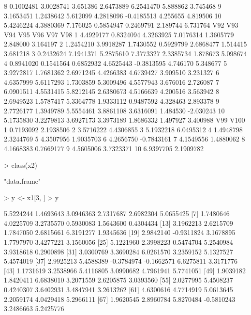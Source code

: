 \documentclass[12pt]{article}
\begin{document}
\begin{Schunk}
\begin{Soutput}
8   0.1002481 3.0028741 3.651386 2.6473889  6.2541470  5.888862 3.745468
9   3.1653451 1.2438642 5.612099 4.2818096 -0.4185513  4.255655 4.819506
10  5.4246224 4.3880369 7.176025 0.5854947  0.2469791  2.189744 6.731764
         V92       V93       V94       V95        V96      V97       V98
1  4.4929177 0.8324094 4.3263925 7.0176314  1.3605779 2.848000  3.164197
2  1.2454210 3.9918287 1.7430552 0.5929799  2.6868477 1.514415  3.681218
3  0.2432624 7.1941371 5.2875610 7.3773327  2.3385734 1.878673  5.098674
4  0.8941020 0.1541564 0.6852932 4.6525443 -0.3813595 4.746170  5.348677
5  3.9272817 1.7681362 2.6971245 4.4266383  4.6739427 3.909510  3.231327
6  4.6357999 5.6117293 1.7303859 5.3009496  4.5577943 3.676016  2.726087
7  6.0901511 4.5531415 5.8212145 2.6380673  4.5166639 4.200516  3.563942
8  2.6949523 1.5787417 5.3364778 1.9333112  0.9487592 4.328463  2.893378
9  2.7726177 1.3949789 5.5554461 3.8861108  3.6316091 1.484530 -2.030243
10 5.1735830 3.2279813 3.6927173 3.3973189  1.8686332 1.497927  3.400988
         V99       V100
1  0.7193092  2.1938506
2  3.5716222  4.4306855
3  5.1932218  6.0495312
4  1.4948798  2.3244769
5  4.3507956  1.9035703
6  4.2656750 -0.7843161
7  4.1549556  1.4880062
8  4.1668383  0.7669177
9  4.5605006  3.7323371
10 6.9397705  2.1909782
\end{Soutput}
\begin{Sinput}
> class(x2)
\end{Sinput}
\begin{Soutput}
[1] "data.frame"
\end{Soutput}
\begin{Sinput}
> y <- x1[3, ] 
> y
\end{Sinput}
\begin{Soutput}
  [1]  5.5224244  1.4693643  3.0946363  2.7317687  2.6982304  5.0655425
  [7]  1.7480646  4.0225709  3.2735570  0.5930083  1.5643600  0.4304434
 [13]  3.1962213  2.6215709  1.7847050  2.6815661  6.3191277  1.9345636
 [19]  2.9842140 -0.9311824  3.1678895  1.7797970  3.4277221  3.1560056
 [25]  5.1221960  2.3998223  0.5474704  5.2540984  3.9318618  0.2900898
 [31]  3.0300769  3.3690284  6.0261570  3.2359152  5.1327527  5.4574019
 [37]  2.9925213  5.4588389 -0.3784974 -0.1662571  6.6275811  3.3171776
 [43]  1.1731619  3.2538966  5.4116805  3.0990682  4.7961941  5.7741051
 [49]  1.9039182  1.8420411  6.6838010  3.2071559  2.6205875  3.0393560
 [55]  2.0277995  5.4508237  0.4240307  3.6402931  3.4847941  3.2613262
 [61]  4.6300616  4.7714919  5.0613645  2.2059174  4.0429418  5.2966111
 [67]  1.9620545  2.8960784  5.8270484 -0.5810243  3.2486663  5.2425776

\end{Soutput}
\end{Schunk}
\end{document}
